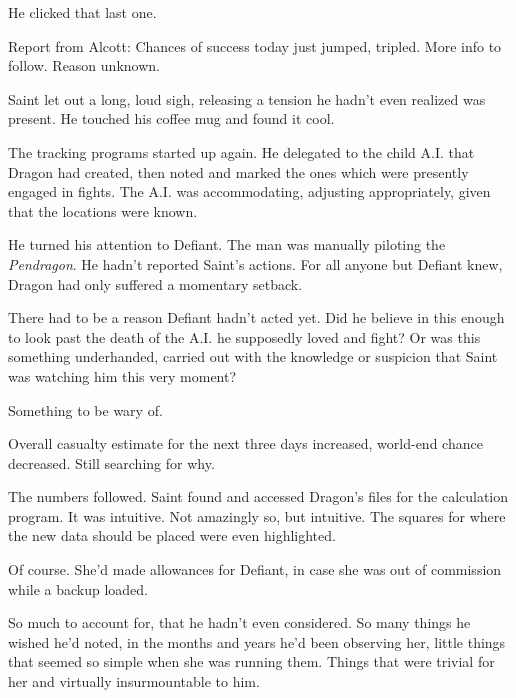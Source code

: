 He clicked that last one.



Report from Alcott:  Chances of success today just jumped, tripled.  More info to follow.  Reason unknown.



Saint let out a long, loud sigh, releasing a tension he hadn't even realized was present.  He touched his coffee mug and found it cool.



The tracking programs started up again.  He delegated to the child A.I. that Dragon had created, then noted and marked the ones which were presently engaged in fights.  The A.I. was accommodating, adjusting appropriately, given that the locations were known.



He turned his attention to Defiant.  The man was manually piloting the \emph{Pendragon}.  He hadn't reported Saint's actions.  For all anyone but Defiant knew, Dragon had only suffered a momentary setback.



There had to be a reason Defiant hadn't acted yet.  Did he believe in this enough to look past the death of the A.I. he supposedly loved and fight?  Or was this something underhanded, carried out with the knowledge or suspicion that Saint was watching him this very moment?



Something to be wary of.



Overall casualty estimate for the next three days increased, world-end chance decreased.  Still searching for why.



The numbers followed.  Saint found and accessed Dragon's files for the calculation program.  It was intuitive.  Not amazingly so, but intuitive.  The squares for where the new data should be placed were even highlighted.



Of course.  She'd made allowances for Defiant, in case she was out of commission while a backup loaded.



So much to account for, that he hadn't even considered.  So many things he wished he'd noted, in the months and years he'd been observing her, little things that seemed so simple when she was running them.  Things that were trivial for her and virtually insurmountable to him.



